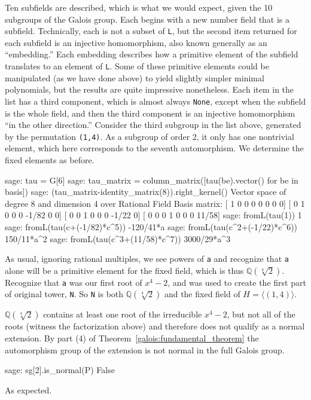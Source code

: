 %
Ten subfields are described, which is what we would expect, given the 10 subgroups of the Galois group.  Each begins with a new number field that is a subfield.  Technically, each is not a subset of \verb?L?, but the second item returned for each subfield is an injective homomorphism, also known generally as an ``embedding.''  Each embedding describes how a primitive element of the subfield translates to an element of \verb?L?.  Some of these primitive elements could be manipulated (as we have done above) to yield slightly simpler minimal polynomials, but the results are quite impressive nonetheless.  Each item in the list has a third component, which is almost always \verb?None?, except when the subfield is the whole field, and then the third component is an injective homomorphism ``in the other direction.''
%
%
Consider the third subgroup in the list above, generated by the permutation \verb?(1,4)?. As a subgroup of order 2, it only has one nontrivial element, which here corresponds to the seventh automorphism.  We determine the fixed elements as before.
%
\begin{sageexample}
sage: tau = G[6]
sage: tau_matrix = column_matrix([tau(be).vector() for be in basis])
sage: (tau_matrix-identity_matrix(8)).right_kernel()
Vector space of degree 8 and dimension 4 over Rational Field
Basis matrix:
[    1     0     0     0     0     0     0     0]
[    0     1     0     0     0 -1/82     0     0]
[    0     0     1     0     0     0 -1/22     0]
[    0     0     0     1     0     0     0 11/58]
sage: fromL(tau(1))
1
sage: fromL(tau(c+(-1/82)*c^5))
-120/41*a
sage: fromL(tau(c^2+(-1/22)*c^6))
150/11*a^2
sage: fromL(tau(c^3+(11/58)*c^7))
3000/29*a^3
\end{sageexample}
%
As usual, ignoring rational multiples, we see powers of \verb?a? and recognize that \verb?a? alone will be a primitive element for the fixed field, which is thus ${\mathbb Q}(\sqrt[4]{2})$.  Recognize that \verb?a? was our first root of $x^4-2$, and was used to create the first part of original tower, \verb?N?.  So \verb?N? is both ${\mathbb Q}(\sqrt[4]{2})$ and the fixed field of $H=\langle(1,4)\rangle$.\par
%
${\mathbb Q}(\sqrt[4]{2})$ contains at least one root of the irreducible $x^4-2$, but not all of the roots (witness the factorization above) and therefore does not qualify as a normal extension.  By part (4) of Theorem~\ref{galois:fundamental_theorem} the automorphism group of the extension is not normal in the full Galois group.
%
\begin{sageexample}
sage: sg[2].is_normal(P)
False
\end{sageexample}
%
As expected.
%